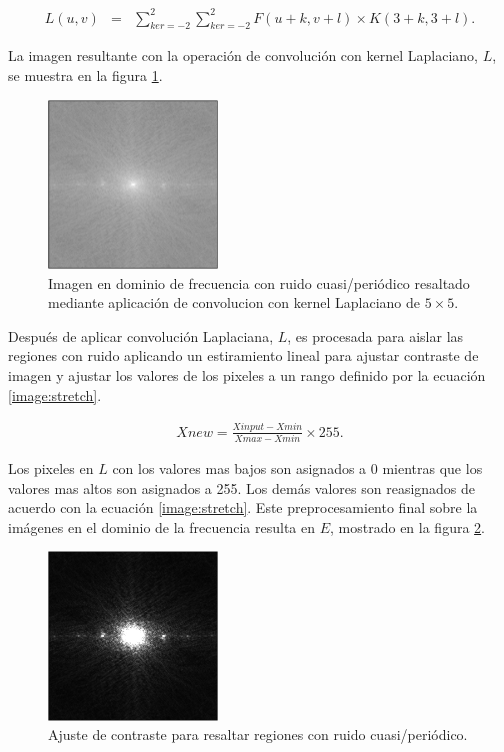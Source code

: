 \documentclass[10pt,letterpaper]{article}
\begin{document}
\begin{eqnarray}
\label{K5x5}
L(u,v)&=&\sum_{ker=-2}^{2}\sum_{ker=-2}^{2}F(u+k,v+l)\times K(3+k,3+l).
\end{eqnarray}

La imagen resultante con la operación de convolución con kernel Laplaciano, $L$, se muestra en la figura \ref{tif25}.

\begin{figure}[H]
	\centering
    \includegraphics[width=0.4\textwidth]{tifs/tif25.png}
    \caption{Imagen en dominio de frecuencia con ruido cuasi/periódico resaltado mediante aplicación de convolucion con kernel Laplaciano de $5 \times 5$.}
    \label{tif25}
\end{figure}

Después de aplicar convolución Laplaciana, $L$, es procesada para aislar las regiones con ruido aplicando un estiramiento lineal para ajustar contraste de imagen y ajustar los valores de los pixeles a un rango definido por la ecuación \ref{image:stretch}.

\begin{eqnarray}
\label{image:stretch} 
Xnew=\frac{Xinput-Xmin}{Xmax-Xmin}\times 255.
\end{eqnarray}

Los pixeles en $L$ con los valores mas bajos son asignados a 0 mientras que los valores mas altos son asignados a 255. Los demás valores son reasignados de acuerdo con la ecuación \ref{image:stretch}. Este preprocesamiento final sobre la imágenes en el dominio de la frecuencia resulta en $E$, mostrado en la figura \ref{tif26}.

\begin{figure}[H]
	\centering
    \includegraphics[width=0.4\textwidth]{tifs/tif26.png}
    \caption{Ajuste de contraste para resaltar regiones con ruido cuasi/periódico.}
    \label{tif26}
\end{figure}
\end{document}
